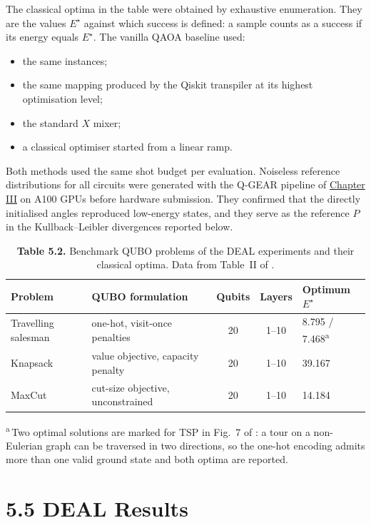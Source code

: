 \documentclass{report}
\theoremstyle{plain}
\theoremstyle{definition}
\theoremstyle{remark}
\begin{document}
The classical optima in the table were obtained by exhaustive enumeration. They are the values $E^{\star}$ against which success is defined: a sample counts as a success if its energy equals $E^{\star}$. The vanilla QAOA baseline used:
\begin{itemize}
\item the same instances;
\item the same mapping produced by the Qiskit transpiler at its highest optimisation level;
\item the standard $X$ mixer;
\item a classical optimiser started from a linear ramp.
\end{itemize}
Both methods used the same shot budget per evaluation. Noiseless reference distributions for all circuits were generated with the Q-GEAR pipeline of \hyperref[ch:qgear]{Chapter III} on A100 GPUs before hardware submission. They confirmed that the directly initialised angles reproduced low-energy states, and they serve as the reference $P$ in the Kullback--Leibler divergences reported below.

\begin{table}[htbp]
\caption{\textbf{Table 5.2.} Benchmark QUBO problems of the DEAL experiments and their classical optima. Data from Table~II of \cite{guo2025deal}.}
\label{tab:nisq:problems}
 \small

\begin{tabular}{llccl}
\toprule
Problem & QUBO formulation & Qubits & Layers & Optimum $E^{\star}$ \\
\midrule
Travelling salesman & one-hot, visit-once penalties & 20 & 1--10 & 8.795 / 7.468\textsuperscript{a} \\
Knapsack            & value objective, capacity penalty & 20 & 1--10 & 39.167 \\
MaxCut              & cut-size objective, unconstrained & 20 & 1--10 & 14.184 \\
\bottomrule
\end{tabular}
\begin{tablenotes}
\textsuperscript{a} Two optimal solutions are marked for TSP in Fig.~7 of \cite{guo2025deal}: a tour on a non-Eulerian graph can be traversed in two directions, so the one-hot encoding admits more than one valid ground state and both optima are reported.
\end{tablenotes}

\end{table}

\section{5.5 DEAL Results}\label{sec:nisq:deal-results}
\end{document}
